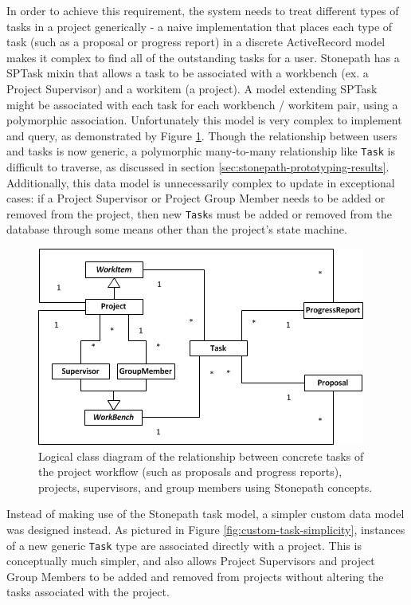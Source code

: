In order to achieve this requirement, the system needs to treat different types of tasks in a project generically - a naive implementation that places each type of task (such as a proposal or progress report) in a discrete ActiveRecord model makes it complex to find all of the outstanding tasks for a user. Stonepath has a SPTask mixin that allows a task to be associated with a workbench (ex. a Project Supervisor) and a workitem (a project). A model extending SPTask might be associated with each task for each workbench / workitem pair, using a polymorphic association. Unfortunately this model is very complex to implement and query, as demonstrated by Figure \ref{fig:sptask-complexity}. Though the relationship between users and tasks is now generic, a polymorphic many-to-many relationship like \verb!Task! is difficult to traverse, as discussed in section \ref{sec:stonepath-prototyping-results}. Additionally, this data model is unnecessarily complex to update in exceptional cases: if a Project Supervisor or Project Group Member needs to be added or removed from the project, then new \verb!Task!s must be added or removed from the database through some means other than the project’s state machine.

\begin{figure}[!htbp]
\centering \includegraphics{./img/case-study-fourth-year-system/task-with-sptask-static-structure}
\caption{Logical class diagram of the relationship between concrete tasks of the project workflow (such as proposals and progress reports), projects, supervisors, and group members using Stonepath concepts.}
\label{fig:sptask-complexity}
\end{figure}

Instead of making use of the Stonepath task model, a simpler custom data model was designed instead. As pictured in Figure \ref{fig:custom-task-simplicity}, instances of a new generic \verb!Task! type are associated directly with a project. This is conceptually much simpler, and also allows Project Supervisors and project Group Members to be added and removed from projects without altering the tasks associated with the project.

